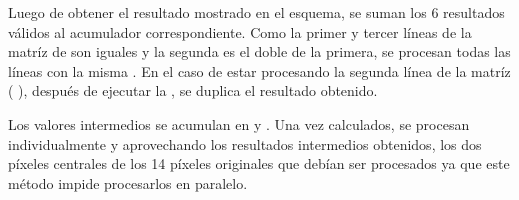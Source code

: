 Luego de obtener el resultado mostrado en el esquema, se suman los 6 resultados válidos al acumulador correspondiente. 
Como la primer y tercer líneas de la matríz de  son iguales y la segunda es el doble de la primera, se procesan todas las líneas 
con la misma . En el caso de estar procesando la segunda línea de la matríz (
), después de ejecutar la  , se duplica el resultado obtenido.

	Los valores intermedios se acumulan en  y . Una vez calculados, se procesan individualmente y aprovechando los resultados
intermedios obtenidos, los dos píxeles centrales de los 14 píxeles originales que debían ser procesados ya que este método impide procesarlos en paralelo.

